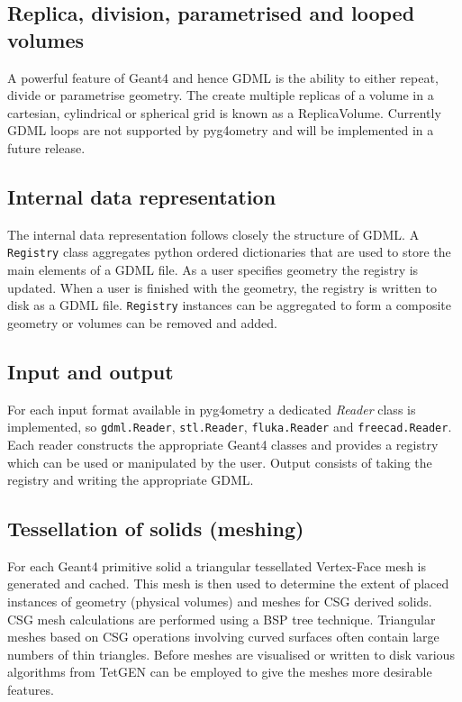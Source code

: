 \documentclass[final,5p,times,twocolumn]{elsarticle}
\begin{document}
\subsection{Replica, division, parametrised and looped volumes}
A powerful feature of Geant4 and hence GDML is the ability to either repeat, divide or parametrise geometry. The create multiple replicas of a volume in a cartesian, cylindrical or 
spherical grid is known as a ReplicaVolume. Currently GDML loops are not supported by pyg4ometry and will be implemented in a future release. 

\subsection{Internal data representation} 
The internal data representation follows closely the structure of GDML. A \verb|Registry| class aggregates python ordered dictionaries that are  used to store the main 
elements of a GDML file. As a user specifies geometry the registry is updated. When a user is finished with the geometry, the registry is written to disk as a GDML file.
\verb|Registry| instances can be aggregated to form a composite geometry or volumes can be removed and added.   
  
\subsection{Input and output} 
For each input format available in pyg4ometry a dedicated {\it Reader} class is implemented, so \verb|gdml.Reader|, \verb|stl.Reader|, \verb|fluka.Reader| 
and \verb|freecad.Reader|. Each reader constructs the appropriate Geant4 classes and provides a registry which can be used or manipulated by the user. 
Output consists of taking the registry and writing the appropriate GDML.

\subsection{Tessellation of solids (meshing)}
For each Geant4 primitive solid a triangular tessellated Vertex-Face mesh is generated and cached. This mesh is then used to determine the extent of placed instances of 
geometry (physical volumes) and meshes for CSG derived solids. CSG mesh calculations are performed using a BSP tree technique. Triangular meshes based
on CSG operations involving curved surfaces often contain large numbers of thin triangles. Before meshes are visualised or written to disk various algorithms from 
TetGEN can be employed to give the meshes more desirable features. 
\end{document}
